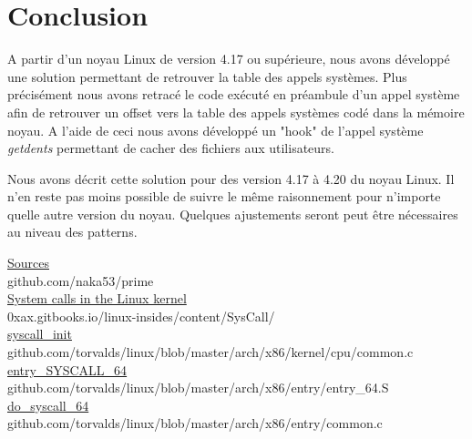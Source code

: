 \documentclass[journal, a4paper]{IEEEtran}
\begin{document}
\section{Conclusion}

A partir d'un noyau Linux de version 4.17 ou supérieure, nous avons développé une solution permettant de retrouver la table des appels systèmes. Plus précisément nous avons retracé le code exécuté en préambule d'un appel système afin de retrouver un offset vers la table des appels systèmes codé dans la mémoire noyau. A l'aide de ceci nous avons développé un "hook" de l'appel système \textit{getdents} permettant de cacher des fichiers aux utilisateurs.

Nous avons décrit cette solution pour des version 4.17 à 4.20 du noyau Linux. Il n'en reste pas moins possible de suivre le même raisonnement pour n'importe quelle autre version du noyau. Quelques ajustements seront peut être nécessaires au niveau des patterns.

\begin{thebibliography}{}
	\href{https://github.com/naka53/prime}{Sources}\\
	github.com/naka53/prime\\

	\href{https://0xax.gitbooks.io/linux-insides/content/SysCall/}{System calls in the Linux kernel}\\
	0xax.gitbooks.io/linux-insides/content/SysCall/\\

	\href{https://github.com/torvalds/linux/blob/master/arch/x86/kernel/cpu/common.c}{syscall\_init}\\
	github.com/torvalds/linux/blob/master/arch/x86/kernel/cpu/common.c\\

	\href{https://github.com/torvalds/linux/blob/master/arch/x86/entry/entry_64.S}{entry\_SYSCALL\_64}\\
	github.com/torvalds/linux/blob/master/arch/x86/entry/entry\_64.S\\

	\href{https://github.com/torvalds/linux/blob/master/arch/x86/entry/common.c}{do\_syscall\_64}\\
	github.com/torvalds/linux/blob/master/arch/x86/entry/common.c\\
\end{thebibliography}
\end{document}
